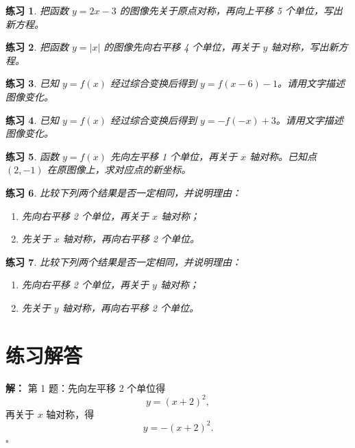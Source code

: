 \documentclass[11pt,a4paper,fontset=fandol]{ctexart}
\theoremstyle{formaltheorem}
\theoremstyle{formalexample}
\newtheorem{exercise}{练习}[section]
\newenvironment{solution}{\par\noindent\textbf{解：}}{\hfill$\square$\par}
\begin{document}
\begin{exercise}
把函数 \(y=2x-3\) 的图像先关于原点对称，再向上平移 5 个单位，写出新方程。
\end{exercise}

\begin{exercise}
把函数 \(y=|x|\) 的图像先向右平移 4 个单位，再关于 \(y\) 轴对称，写出新方程。
\end{exercise}

\begin{exercise}
已知 \(y=f(x)\) 经过综合变换后得到 \(y=f(x-6)-1\)。请用文字描述图像变化。
\end{exercise}

\begin{exercise}
已知 \(y=f(x)\) 经过综合变换后得到 \(y=-f(-x)+3\)。请用文字描述图像变化。
\end{exercise}

\begin{exercise}
函数 \(y=f(x)\) 先向左平移 1 个单位，再关于 \(x\) 轴对称。已知点 \((2,-1)\) 在原图像上，求对应点的新坐标。
\end{exercise}

\begin{exercise}
比较下列两个结果是否一定相同，并说明理由：
\begin{enumerate}
  \item 先向右平移 2 个单位，再关于 \(x\) 轴对称；
  \item 先关于 \(x\) 轴对称，再向右平移 2 个单位。
\end{enumerate}
\end{exercise}

\begin{exercise}
比较下列两个结果是否一定相同，并说明理由：
\begin{enumerate}
  \item 先向右平移 2 个单位，再关于 \(y\) 轴对称；
  \item 先关于 \(y\) 轴对称，再向右平移 2 个单位。
\end{enumerate}
\end{exercise}

\section{练习解答}

\begin{solution}
第 1 题：先向左平移 2 个单位得
\[
y=(x+2)^2,
\]
再关于 \(x\) 轴对称，得
\[
y=-(x+2)^2.
\]
\end{solution}
\end{document}
